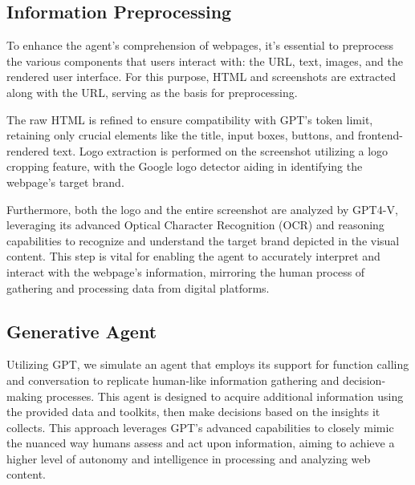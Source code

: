 
\subsection{Information Preprocessing}

To enhance the agent's comprehension of webpages, it's essential to preprocess the various components that users interact with: the URL, text, images, and the rendered user interface. For this purpose, HTML and screenshots are extracted along with the URL, serving as the basis for preprocessing.

The raw HTML is refined to ensure compatibility with GPT's token limit, retaining only crucial elements like the title, input boxes, buttons, and frontend-rendered text. Logo extraction is performed on the screenshot utilizing a logo cropping feature, with the Google logo detector aiding in identifying the webpage's target brand. 

Furthermore, both the logo and the entire screenshot are analyzed by GPT4-V\cite{openai2023gpt}, leveraging its advanced Optical Character Recognition (OCR) and reasoning capabilities to recognize and understand the target brand depicted in the visual content. This step is vital for enabling the agent to accurately interpret and interact with the webpage's information, mirroring the human process of gathering and processing data from digital platforms.

\subsection{Generative Agent}

Utilizing GPT\cite{openai2023gpt}, we simulate an agent that employs its support for function calling and conversation to replicate human-like information gathering and decision-making processes. This agent is designed to acquire additional information using the provided data and toolkits, then make decisions based on the insights it collects. This approach leverages GPT's advanced capabilities to closely mimic the nuanced way humans assess and act upon information, aiming to achieve a higher level of autonomy and intelligence in processing and analyzing web content.  

